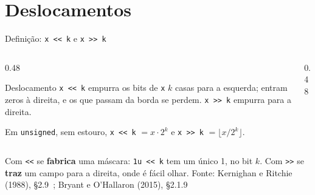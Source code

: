 \documentclass[aspectratio=169]{beamer}
\newcommand{\bits}[3]{%
  \foreach \b [count=\k from 0] in {#3} {
    \node[bit\b] at (#1+0.42*\k, #2) {\b};
  }
}
\newcommand{\fonte}[1]{\vfill\hfill{\scriptsize\textcolor{UFSGray}{Fonte: #1}}}
\begin{document}
\section{Deslocamentos}

\begin{frame}{Definição: \texttt{x <{}< k} e \texttt{x >{}> k}}
  \begin{columns}[c]
    \begin{column}{0.48\textwidth}
      \begin{block}{Deslocamento}
        \small \texttt{x <{}< k} empurra os bits de \texttt{x} $k$ casas para a
        esquerda; entram zeros à direita, e os que passam da borda se perdem.
        \texttt{x >{}> k} empurra para a direita.
      \end{block}
      \small Em \texttt{unsigned}, sem estouro,
      \texttt{x <{}< k} $= x \cdot 2^k$ e \texttt{x >{}> k} $= \lfloor x / 2^k
      \rfloor$.
    \end{column}
    \begin{column}{0.48\textwidth}
      \begin{center}
      \end{center}
    \end{column}
  \end{columns}
  \medskip
  \small Com \texttt{<{}<} se \textbf{fabrica} uma máscara: \texttt{1u <{}< k} tem
  um único 1, no bit $k$. Com \texttt{>{}>} se \textbf{traz} um campo para a
  direita, onde é fácil olhar.
  \fonte{Kernighan e Ritchie (1988), §2.9~\cite{kernighan1988c};
    Bryant e O'Hallaron (2015), §2.1.9~\cite{bryant2015computer}}
\end{frame}
\end{document}
